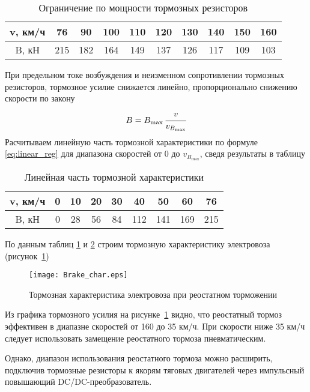\begin{table}[H]
 \centering
 \caption{Ограничение по мощности тормозных резисторов}
 \begin{tabular}{|c||c|c|c|c|c|c|c|c|c|}
  \hline
  v, км/ч & 76 & 90 & 100 & 110 & 120 & 130 & 140 & 150 & 160 \\ \hline
  B, кН & 215 & 182 & 164 & 149 & 137 & 126 & 117 & 109 & 103 \\ \hline 
 \end{tabular}
 \label{tab:field_reg}
\end{table}

При предельном токе возбуждения и неизменном сопротивлении тормозных резисторов, тормозное усилие снижается линейно, пропорционально снижению скорости по закону
\begin{equation}
 \label{eq:linear_reg}
 B = B_{\max} \, \cfrac{v}{v_{B_{\max}}}
\end{equation}
Расчитываем линейную часть тормозной характеристики по формуле \eqref{eq:linear_reg} для диапазона скоростей от 0 до $v_{B_{\max}}$, сведя результаты в таблицу 

\begin{table}[H]
 \centering
 \caption{Линейная часть тормозной характеристики}
 \begin{tabular}{|c||c|c|c|c|c|c|c|c|}
  \hline
  v, км/ч & 0 & 10 & 20 & 30 & 40 & 50 & 60 & 76 \\ \hline
  B, кН & 0 & 28 & 56 & 84 & 112 & 141 & 169 & 215 \\ \hline 
 \end{tabular}
 \label{tab:linear_reg}
\end{table}

По данным таблиц \ref{tab:field_reg} и \ref{tab:linear_reg} строим тормозную характеристику электровоза (рисунок~\ref{fig:Brake_char})
\begin{figure}[H]
    \centering    
    \texttt{[image: Brake\_char.eps]}
    \caption{Тормозная характеристика электровоза при реостатном торможении}
    \label{fig:Brake_char}
\end{figure}

Из графика тормозного усилия на рисунке~\ref{fig:Brake_char} видно, что реостатный тормоз эффективен в диапазне скоростей от 160 до 35 км/ч. При скорости ниже 35 км/ч следует использовать замещение реостатного тормоза пневматическим.

Однако, диапазон использования реостатного тормоза можно расширить, подключив тормозные резисторы к якорям тяговых двигателей через импульсный повышающий DC/DC-преобразователь.


